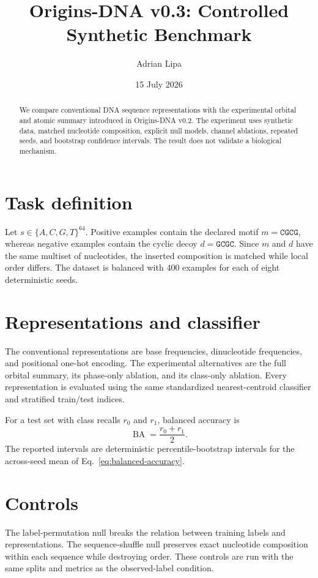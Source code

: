 \documentclass[11pt]{article}
\title{Origins-DNA v0.3: Controlled Synthetic Benchmark}
\author{Adrian Lipa}
\date{15 July 2026}
\begin{document}
\maketitle

\begin{abstract}
We compare conventional DNA sequence representations with the experimental
orbital and atomic summary introduced in Origins-DNA v0.2.  The experiment uses
synthetic data, matched nucleotide composition, explicit null models, channel
ablations, repeated seeds, and bootstrap confidence intervals.  The result does
not validate a biological mechanism.
\end{abstract}

\section{Task definition}
Let $s\in\{A,C,G,T\}^{64}$.  Positive examples contain the declared motif
$m=\texttt{CGCG}$, whereas negative examples contain the cyclic decoy
$d=\texttt{GCGC}$.  Since $m$ and $d$ have the same multiset of nucleotides,
the inserted composition is matched while local order differs.  The dataset is
balanced with 400 examples for each of eight deterministic seeds.

\section{Representations and classifier}
The conventional representations are base frequencies, dinucleotide
frequencies, and positional one-hot encoding.  The experimental alternatives
are the full orbital summary, its phase-only ablation, and its class-only
ablation.  Every representation is evaluated using the same standardized
nearest-centroid classifier and stratified train/test indices.

For a test set with class recalls $r_0$ and $r_1$, balanced accuracy is
\begin{equation}
  \operatorname{BA}=\frac{r_0+r_1}{2}.
  \label{eq:balanced-accuracy}
\end{equation}
The reported intervals are deterministic percentile-bootstrap intervals for
the across-seed mean of Eq.~\eqref{eq:balanced-accuracy}.

\section{Controls}
The label-permutation null breaks the relation between training labels and
representations.  The sequence-shuffle null preserves exact nucleotide
composition within each sequence while destroying order.  These controls are
run with the same splits and metrics as the observed-label condition.
\end{document}
